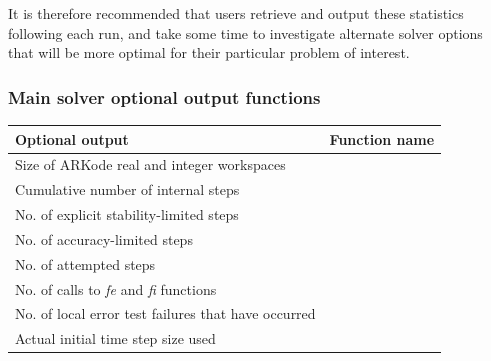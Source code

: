 \documentclass[letterpaper,10pt,english]{sphinxmanual}
\begin{document}
It is therefore recommended that users retrieve and output these
statistics following each run, and take some time to investigate
alternate solver options that will be more optimal for their
particular problem of interest.


\subsubsection{Main solver optional output functions}
\label{c_interface/User_callable:main-solver-optional-output-functions}\label{c_interface/User_callable:cinterface-arkodemainoutputs}
\begin{tabulary}{\linewidth}{|L|L|}
\hline
\textbf{\relax 
Optional output
} & \textbf{\relax 
Function name
}\\\hline

Size of ARKode real and integer workspaces
 & 
{\hyperref[c_interface/User_callable:ARKodeGetWorkSpace]{}}
\\\hline

Cumulative number of internal steps
 & 
{\hyperref[c_interface/User_callable:ARKodeGetNumSteps]{}}
\\\hline

No. of explicit stability-limited steps
 & 
{\hyperref[c_interface/User_callable:ARKodeGetNumExpSteps]{}}
\\\hline

No. of accuracy-limited steps
 & 
{\hyperref[c_interface/User_callable:ARKodeGetNumAccSteps]{}}
\\\hline

No. of attempted steps
 & 
{\hyperref[c_interface/User_callable:ARKodeGetNumStepAttempts]{}}
\\\hline

No. of calls to \emph{fe} and \emph{fi} functions
 & 
{\hyperref[c_interface/User_callable:ARKodeGetNumRhsEvals]{}}
\\\hline

No. of local error test failures that have occurred
 & 
{\hyperref[c_interface/User_callable:ARKodeGetNumErrTestFails]{}}
\\\hline

Actual initial time step size used
 & 
{\hyperref[c_interface/User_callable:ARKodeGetActualInitStep]{}}
\\\hline


\end{tabulary}
\end{document}
